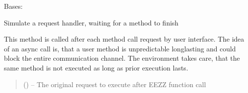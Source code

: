 \documentclass[letterpaper,10pt,english]{sphinxmanual}
\begin{document}
\begin{savenotes}\begin{fulllineitems}
\label{\detokenize{eezz:eezz.websocket.TestSocketServer}}
\pysigstartsignatures
{}
\pysigstopsignatures
\sphinxAtStartPar
Bases: {\hyperref[\detokenize{eezz:eezz.websocket.TWebSocketClient}]{}}

\sphinxAtStartPar
Simulate a request handler, waiting for a method to finish

\begin{savenotes}\begin{fulllineitems}
\label{\detokenize{eezz:eezz.websocket.TestSocketServer.handle_aync_request}}
\pysigstartsignatures
{}
\pysigstopsignatures
\sphinxAtStartPar
This method is called after each method call request by user interface. The idea of an async call is,
that a user method is unpredictable long\sphinxhyphen{}lasting and could block the entire communication channel.
The environment takes care, that the same method is not executed as long as prior execution lasts.
\begin{quote}\begin{description}
\sphinxAtStartPar
{} () – The original request to execute after EEZZ function call

\end{description}\end{quote}

\end{fulllineitems}\end{savenotes}


\end{fulllineitems}\end{savenotes}
\end{document}
